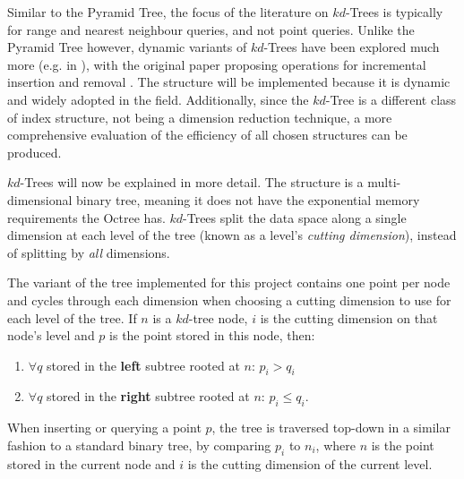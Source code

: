 Similar to the Pyramid Tree, the focus of the literature on $kd$-Trees is typically for range and nearest neighbour queries, and not point queries. Unlike the Pyramid Tree however, dynamic variants of $kd$-Trees have been explored much more (e.g. in \cite{bkd-tree, kdb-tree}), with the original paper proposing operations for incremental insertion and removal \cite{kd-tree}. The structure will be implemented because it is dynamic and widely adopted in the field. Additionally, since the $kd$-Tree is a different class of index structure, not being a dimension reduction technique, a more comprehensive evaluation of the efficiency of all chosen structures can be produced.

$kd$-Trees will now be explained in more detail. The structure is a multi-dimensional binary tree, meaning it does not have the exponential memory requirements the Octree has. $kd$-Trees split the data space along a single dimension at each level of the tree (known as a level's \textit{cutting dimension}), instead of splitting by \textit{all} dimensions.

The variant of the tree implemented for this project contains one point per node and cycles through each dimension when choosing a cutting dimension to use for each level of the tree. If $n$ is a $kd$-tree node, $i$ is the cutting dimension on that node's level and $p$ is the point stored in this node, then:
\begin{enumerate}
	\item $\forall q$ stored in the \textbf{left} subtree rooted at $n$: $p_i > q_i$ 
	\item $\forall q$ stored in the \textbf{right} subtree rooted at $n$: $p_i \leq q_i$.
\end{enumerate}
When inserting or querying a point $p$, the tree is traversed top-down in a similar fashion to a standard binary tree, by comparing $p_i$ to $n_i$, where $n$ is the point stored in the current node and $i$ is the cutting dimension of the current level.

